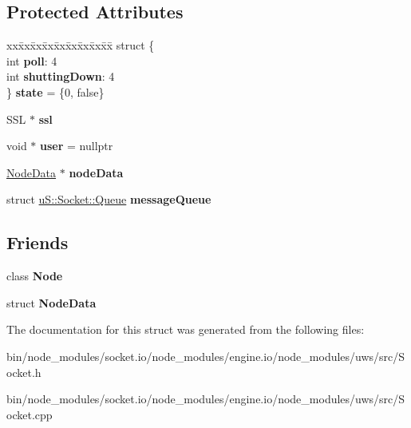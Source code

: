 \subsection*{Protected Attributes}
\begin{DoxyCompactItemize}
\item 
\mbox{\label{structu_s_1_1_socket_a08198a8f8ce327766548dbe865ad9abf}} 
\begin{tabbing}
xx\=xx\=xx\=xx\=xx\=xx\=xx\=xx\=xx\=\kill
struct \{\\
\>int {\bfseries poll}: 4\\
\>int {\bfseries shuttingDown}: 4\\
\} {\bfseries state} = \{0, false\}\\

\end{tabbing}\item 
\mbox{\label{structu_s_1_1_socket_a08a28a30f98242ff37fa1918e158218e}} 
S\+SL $\ast$ {\bfseries ssl}
\item 
\mbox{\label{structu_s_1_1_socket_a3d59d676b6334ab2a1e0e35a1221db5f}} 
void $\ast$ {\bfseries user} = nullptr
\item 
\mbox{\label{structu_s_1_1_socket_a2f4fc81e5838284b4bf8b36eeff2b501}} 
\mbox{\hyperlink{structu_s_1_1_node_data}{Node\+Data}} $\ast$ {\bfseries node\+Data}
\item 
\mbox{\label{structu_s_1_1_socket_aa4ed377f563ebf8361d23fa8ebe68398}} 
struct \mbox{\hyperlink{structu_s_1_1_socket_1_1_queue}{u\+S\+::\+Socket\+::\+Queue}} {\bfseries message\+Queue}
\end{DoxyCompactItemize}
\subsection*{Friends}
\begin{DoxyCompactItemize}
\item 
\mbox{\label{structu_s_1_1_socket_a6db9d28bd448a131448276ee03de1e6d}} 
class {\bfseries Node}
\item 
\mbox{\label{structu_s_1_1_socket_ae39d0b60fda531523b009a9c5e234400}} 
struct {\bfseries Node\+Data}
\end{DoxyCompactItemize}


The documentation for this struct was generated from the following files\+:\begin{DoxyCompactItemize}
\item 
bin/node\+\_\+modules/socket.\+io/node\+\_\+modules/engine.\+io/node\+\_\+modules/uws/src/Socket.\+h\item 
bin/node\+\_\+modules/socket.\+io/node\+\_\+modules/engine.\+io/node\+\_\+modules/uws/src/Socket.\+cpp\end{DoxyCompactItemize}
